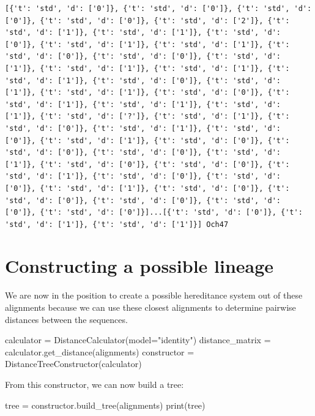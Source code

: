 \documentclass[
  a4paperpaper,
  ,captions=tableheading
]{scrbook}
\newenvironment{Shaded}{\begin{snugshade}}{\end{snugshade}}
\newcommand{\BuiltInTok}[1]{\textcolor[rgb]{0.00,0.23,0.31}{#1}}
\newcommand{\NormalTok}[1]{\textcolor[rgb]{0.00,0.23,0.31}{#1}}
\newcommand{\OperatorTok}[1]{\textcolor[rgb]{0.37,0.37,0.37}{#1}}
\newcommand{\StringTok}[1]{\textcolor[rgb]{0.13,0.47,0.30}{#1}}
\begin{document}
\begin{verbatim}
[{'t': 'std', 'd': ['0']}, {'t': 'std', 'd': ['0']}, {'t': 'std', 'd': ['0']}, {'t': 'std', 'd': ['0']}, {'t': 'std', 'd': ['2']}, {'t': 'std', 'd': ['1']}, {'t': 'std', 'd': ['1']}, {'t': 'std', 'd': ['0']}, {'t': 'std', 'd': ['1']}, {'t': 'std', 'd': ['1']}, {'t': 'std', 'd': ['0']}, {'t': 'std', 'd': ['0']}, {'t': 'std', 'd': ['1']}, {'t': 'std', 'd': ['1']}, {'t': 'std', 'd': ['1']}, {'t': 'std', 'd': ['1']}, {'t': 'std', 'd': ['0']}, {'t': 'std', 'd': ['1']}, {'t': 'std', 'd': ['1']}, {'t': 'std', 'd': ['0']}, {'t': 'std', 'd': ['1']}, {'t': 'std', 'd': ['1']}, {'t': 'std', 'd': ['1']}, {'t': 'std', 'd': ['?']}, {'t': 'std', 'd': ['1']}, {'t': 'std', 'd': ['0']}, {'t': 'std', 'd': ['1']}, {'t': 'std', 'd': ['0']}, {'t': 'std', 'd': ['1']}, {'t': 'std', 'd': ['0']}, {'t': 'std', 'd': ['0']}, {'t': 'std', 'd': ['0']}, {'t': 'std', 'd': ['1']}, {'t': 'std', 'd': ['0']}, {'t': 'std', 'd': ['0']}, {'t': 'std', 'd': ['1']}, {'t': 'std', 'd': ['0']}, {'t': 'std', 'd': ['0']}, {'t': 'std', 'd': ['1']}, {'t': 'std', 'd': ['0']}, {'t': 'std', 'd': ['0']}, {'t': 'std', 'd': ['0']}, {'t': 'std', 'd': ['0']}, {'t': 'std', 'd': ['0']}]...[{'t': 'std', 'd': ['0']}, {'t': 'std', 'd': ['1']}, {'t': 'std', 'd': ['1']}] Och47
\end{verbatim}

\hypertarget{constructing-a-possible-lineage}{%
\section{Constructing a possible
lineage}\label{constructing-a-possible-lineage}}

We are now in the position to create a possible hereditance system out
of these alignments because we can use these closest alignments to
determine pairwise distances between the sequences.

\begin{Shaded}
\begin{Highlighting}[]
\NormalTok{calculator }\OperatorTok{=}\NormalTok{ DistanceCalculator(model}\OperatorTok{=}\StringTok{"identity"}\NormalTok{)}
\NormalTok{distance\_matrix }\OperatorTok{=}\NormalTok{ calculator.get\_distance(alignments)}
\NormalTok{constructor }\OperatorTok{=}\NormalTok{ DistanceTreeConstructor(calculator)}
\end{Highlighting}
\end{Shaded}

From this constructor, we can now build a tree:

\begin{Shaded}
\begin{Highlighting}[]
\NormalTok{tree }\OperatorTok{=}\NormalTok{ constructor.build\_tree(alignments)}
\BuiltInTok{print}\NormalTok{(tree)}
\end{Highlighting}
\end{Shaded}
\end{document}
